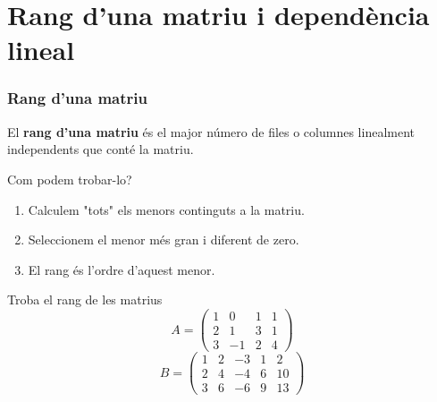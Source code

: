 \documentclass{beamer}
\begin{document}
\section{Rang d'una matriu i dependència lineal}
\begin{frame}
  \frametitle{Rang d'una matriu}

  \begin{definicio}
    El {\bf rang d'una matriu} és el major número de files o columnes linealment independents que conté la matriu.
  \end{definicio}
  Com podem trobar-lo?
  \begin{enumerate}
    \item Calculem "tots" els menors continguts a la matriu.
    \item Seleccionem el menor més gran i diferent de zero.
    \item El rang és l'ordre d'aquest menor.
  \end{enumerate}
\end{frame}
\begin{frame}
  \begin{exercici}{}
    Troba el rang de les matrius
    \[A=
      \begin{pmatrix}
        1 & 0 & 1 & 1\\
        2 & 1 & 3 & 1\\
        3 & -1& 2 & 4
      \end{pmatrix}
    \]
    \[B=
      \begin{pmatrix}
        1 & 2 &-3 & 1 & 2\\
        2 & 4 &-4 & 6 & 10\\
        3 & 6 &-6 & 9 & 13
      \end{pmatrix}
    \]
  \end{exercici}
\end{frame}
\end{document}
